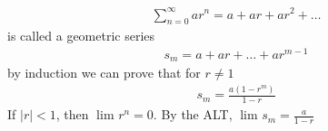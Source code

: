 \begin{eg}
	\begin{align}
		\sum_{n=0}^{\infty} a r^{n} = a + a r + a r^{2} + \ldots
	\end{align}
	is called a geometric series
	\begin{align}
		s_m = a + a r + \ldots + a r^{m-1}
	\end{align}
	by induction we can prove that for $r \neq 1$ 
	\begin{align}
		s_m = \frac{a\left( 1 - r^{m} \right) }{1 - r}
	\end{align}
	If $\left|r\right| < 1$, then $\lim_{} r^{n} = 0$. By the ALT, $\lim_{} s_m = \frac{a}{1 - r}$
\end{eg}








